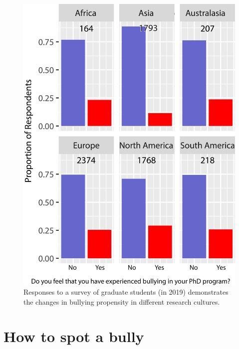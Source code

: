 \documentclass[
]{krantz}
\begin{document}
\begin{figure}
\includegraphics[width=0.95\linewidth]{figures/bully} \caption{Responses to a survey of graduate students (in 2019) demonstrates the changes in bullying propensity in different research cultures.}\label{fig:bully}
\end{figure}

\hypertarget{how-to-spot-a-bully}{%
\section{How to spot a bully}\label{how-to-spot-a-bully}}
\end{document}
